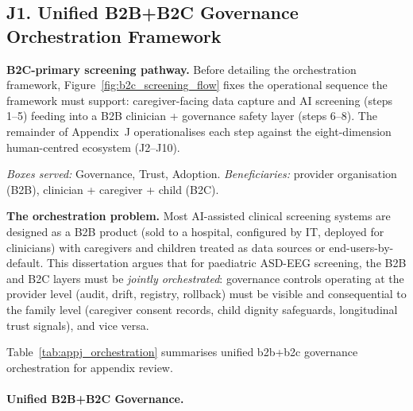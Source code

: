 \subsection*{J1. Unified B2B+B2C Governance Orchestration Framework}

\noindent\textbf{B2C-primary screening pathway.} Before detailing the orchestration framework, Figure~\ref{fig:b2c_screening_flow} fixes the operational sequence the framework must support: caregiver-facing data capture and AI screening (steps 1--5) feeding into a B2B clinician + governance safety layer (steps 6--8). The remainder of Appendix~J operationalises each step against the eight-dimension human-centred ecosystem (J2--J10).



\label{sec:appj_orchestration}

\noindent\emph{Boxes served:} Governance, Trust, Adoption. \emph{Beneficiaries:} provider organisation (B2B), clinician + caregiver + child (B2C).

\noindent\textbf{The orchestration problem.} Most AI-assisted clinical screening systems are designed as a B2B product (sold to a hospital, configured by IT, deployed for clinicians) with caregivers and children treated as data sources or end-users-by-default. This dissertation argues that for paediatric ASD-EEG screening, the B2B and B2C layers must be \emph{jointly orchestrated}: governance controls operating at the provider level (audit, drift, registry, rollback) must be visible and consequential to the family level (caregiver consent records, child dignity safeguards, longitudinal trust signals), and vice versa.

\noindent Table~\ref{tab:appj_orchestration} summarises unified b2b+b2c governance orchestration for appendix review.

\paragraph[Unified B2B+B2C Governance]{Unified B2B+B2C Governance.}




